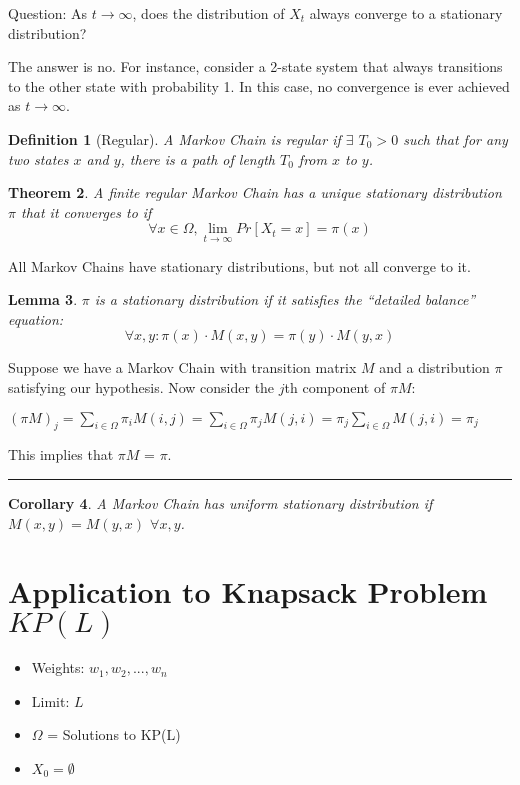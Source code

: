 \documentclass[twoside]{article}
\newcounter{lecnum}
\newtheorem{theorem}{Theorem}[lecnum]
\newtheorem{lemma}[theorem]{Lemma}
\newtheorem{corollary}[theorem]{Corollary}
\newtheorem{definition}[theorem]{Definition}
\newenvironment{proof}{{\bf Proof:}}{\hfill\rule{2mm}{2mm}}
\begin{document}
Question: As $t \rightarrow \infty$, does the distribution of $X_t$ always converge to a stationary distribution?

The answer is no. For instance, consider a 2-state system that always transitions to the other state with probability 1. In this case, no convergence is ever achieved as $t \rightarrow \infty$.

\begin{definition}[Regular]
   A Markov Chain is regular if $\exists$ $T_0 > 0$ such that for any two states $x$ and $y$, there is a path of length $T_0$ from $x$ to $y$.
\end{definition}

\begin{theorem}
   A finite regular Markov Chain has a unique stationary distribution $\pi$ that it converges to if
   $$
   \forall x \in \Omega, \lim_{t \rightarrow \infty} Pr[X_t = x] = \pi(x)
   $$
\end{theorem}

All Markov Chains have stationary distributions, but not all converge to it.

\begin{lemma}
   $\pi$ is a stationary distribution if it satisfies the ``detailed balance'' equation:
   $$
   \forall x,y: \pi(x) \cdot M(x, y) = \pi(y) \cdot M(y, x)
   $$
\end{lemma}

\begin{proof}
Suppose we have a Markov Chain with transition matrix $M$ and a distribution $\pi$ satisfying our hypothesis. Now consider the $j$th component of $\pi M:$

$(\pi M)_j = \sum_{i \in \Omega} \pi_i M(i, j) = \sum_{i \in \Omega} \pi_j M(j, i) = \pi_j \sum_{i \in \Omega}M(j, i) = \pi_j$

This implies that $\pi M$ = $\pi.$

\end{proof}

\begin{corollary}
\label{knapsack}
   A Markov Chain has uniform stationary distribution if $M(x, y) = M(y, x)$ $\forall x, y$.
\end{corollary}

\section{Application to Knapsack Problem $KP(L)$}

\begin{itemize}
   \item Weights: $w_1,w_2, ..., w_n$
   \item Limit: $L$
   \item $\Omega$ = Solutions to KP(L)
   \item $X_0 = \emptyset$
\end{itemize}
\end{document}
